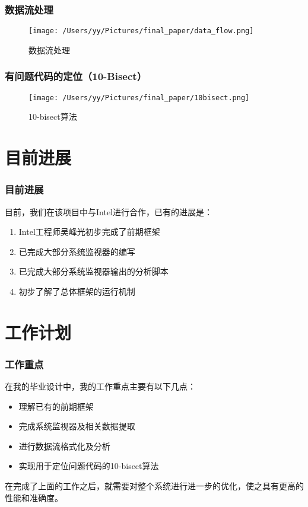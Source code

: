 \documentclass[xcolor=dvipsnames,11pt]{beamer}
\begin{document}
\begin{frame}
\frametitle{数据流处理}
\begin{figure}[htp]
\centering
\texttt{[image: /Users/yy/Pictures/final\_paper/data\_flow.png]}
\caption{数据流处理}
\label{}
\end{figure}
\end{frame}

\begin{frame}
\frametitle{有问题代码的定位（10-Bisect）}
\begin{figure}[htp]
\centering
\texttt{[image: /Users/yy/Pictures/final\_paper/10bisect.png]}
\caption{10-bisect算法}
\label{}
\end{figure}

\end{frame}


\section{目前进展}

\begin{frame}
\frametitle{目前进展}
目前，我们在该项目中与Intel进行合作，已有的进展是：
\begin{enumerate}
\item Intel工程师吴峰光初步完成了前期框架
\item 已完成大部分系统监视器的编写
\item 已完成大部分系统监视器输出的分析脚本
\item 初步了解了总体框架的运行机制
\end{enumerate}
\end{frame}



\section{工作计划}

\begin{frame}
\frametitle{工作重点}
在我的毕业设计中，我的工作重点主要有以下几点：
\begin{itemize}
\item 理解已有的前期框架
\item 完成系统监视器及相关数据提取
\item 进行数据流格式化及分析
\item 实现用于定位问题代码的10-bisect算法
\end{itemize}



在完成了上面的工作之后，就需要对整个系统进行进一步的优化，使之具有更高的性能和准确度。
\end{frame}
\end{document}
